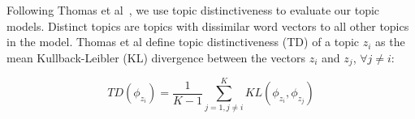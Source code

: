 

Following Thomas et al~\cite{Thomas-etal:2011}, we use topic distinctiveness
to evaluate our topic models.
Distinct topics are topics with dissimilar word vectors to all other topics in the model.
Thomas et al define topic distinctiveness (TD) of a topic $z_i$ as the mean
Kullback-Leibler (KL) divergence between the vectors $z_i$ and $z_j$, $\forall j \neq i$:

\begin{equation}
TD(\phi_{z_i}) = 
\frac{1}{K - 1}
\sum_{j=1,j \neq i}^{K}
KL(\phi_{z_i}, \phi_{z_j})
\label{eq:topicdistinctiveness}
\end{equation}

